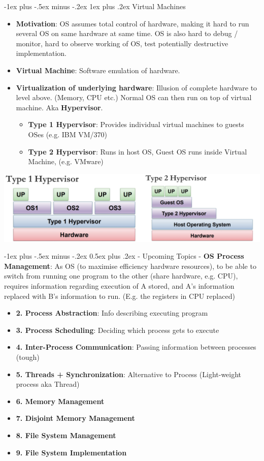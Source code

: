 \documentclass[10pt, landscape]{article}
\makeatletter
\renewcommand{\section}{\@startsection{section}{1}{0mm}%
                                {-1ex plus -.5ex minus -.2ex}%
                                {0.5ex plus .2ex}%
                                {\normalfont\large\bfseries}}
\renewcommand{\subsubsection}{\@startsection{subsubsection}{3}{0mm}%
                                {-1ex plus -.5ex minus -.2ex}%
                                {1ex plus .2ex}%
                                {\normalfont\small\bfseries}}
\makeatother
\begin{document}
\begin{multicols*}{3}
\subsubsection{Virtual Machines}
\begin{itemize}
\item \textbf{Motivation}: OS assumes total control of hardware, making it hard to run several OS on same hardware at same time. OS is also hard to debug / monitor, hard to observe working of OS, test potentially destructive implementation.
\item \textbf{Virtual Machine}: Software emulation of hardware. 
\item \textbf{Virtualization of underlying hardware}: Illusion of complete hardware to level above. (Memory, CPU etc.) Normal OS can then run on top of virtual machine. Aka \textbf{Hypervisor}. 
	\begin{itemize}
	\item \textbf{Type 1 Hypervisor}: Provides individual virtual machines to guests OSes (e.g. IBM VM/370)
	\item \textbf{Type 2 Hypervisor}: Runs in host OS, Guest OS runs inside Virtual Machine, (e.g. VMware)
	\end{itemize}
\end{itemize}
\centerline{\includegraphics[width=0.9\linewidth]{hypervisor}}

\section{- Upcoming Topics -}
\textbf{OS Process Management}: As OS (to maximise efficiency hardware resources), to be able to switch from running one program to the other (share hardware, e.g. CPU), requires information regarding execution of A stored, and A's information replaced with B's information to run. (E.g. the registers in CPU replaced)
\begin{itemize}
	\item \textbf{2. Process Abstraction}: Info describing executing program
	\item \textbf{3. Process Scheduling}: Deciding which process gets to execute
	\item \textbf{4. Inter-Process Communication}: Passing information between processes (tough)
	\item \textbf{5. Threads + Synchronization}: Alternative to Process (Light-weight process aka Thread)
	\item \textbf{6. Memory Management}
	\item \textbf{7. Disjoint Memory Management}
	\item \textbf{8. File System Management}
	\item \textbf{9. File System Implementation}
\end{itemize}



\end{multicols*}
\end{document}
